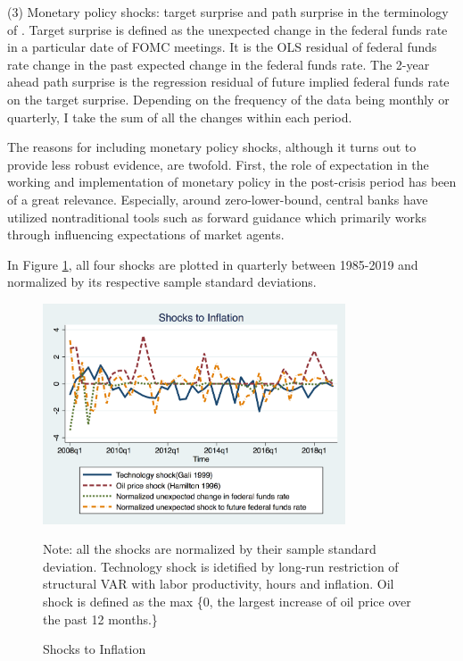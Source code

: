 \documentclass[12pt]{article}
\begin{document}
	(3) Monetary policy shocks: target surprise and path surprise in the terminology of \citet{laseen2011anticipated}. Target surprise is defined as the unexpected change in the federal funds rate in a particular date of FOMC meetings. It is the OLS residual of federal funds rate change in the past expected change in the federal funds rate. The 2-year ahead path surprise is the regression residual of future implied federal funds rate on the target surprise. Depending on the frequency of the data being monthly or quarterly, I take the sum of all the changes within each period.   
	
	The reasons for including monetary policy shocks, although it turns out to provide less robust evidence, are twofold. First, the role of expectation in the working and implementation of monetary policy in the post-crisis period has been of a great relevance. Especially, around zero-lower-bound, central banks have utilized nontraditional tools such as forward guidance which primarily works through influencing expectations of market agents. 
		
	
	In Figure \ref{Inflationshocks}, all four shocks are plotted in quarterly between 1985-2019 and normalized by its respective sample standard deviations. 
	
	\begin{figure}[ht]
		\centering
		\includegraphics[width=0.8\textwidth,totalheight=0.6\textwidth]{figures/inf_shocksQ.png}
			\begin{flushleft}
			{\footnotesize Note: all the shocks are normalized by their sample standard deviation. Technology shock is idetified by long-run restriction of structural VAR with labor productivity, hours and inflation. Oil shock is defined as the max \{0, the largest increase of oil price over the past 12 months.\} }
		\end{flushleft}
		\caption{ Shocks to Inflation}
		\label{Inflationshocks}
	\end{figure}
	
\end{document}
